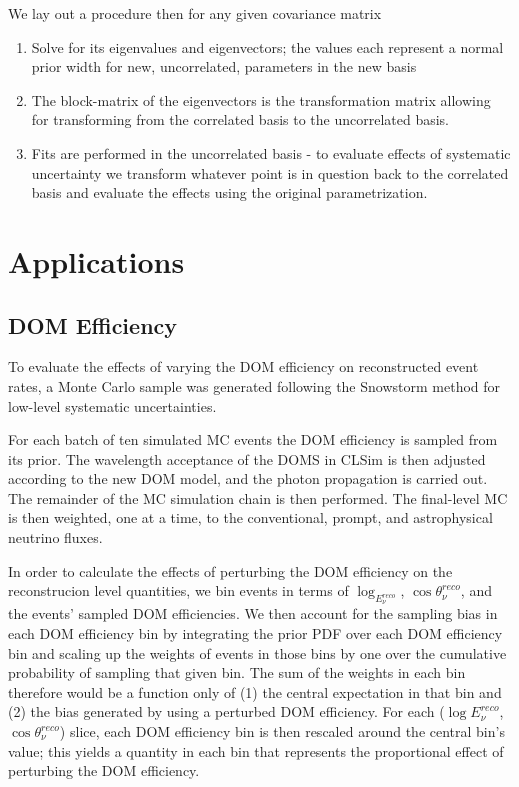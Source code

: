 \documentclass[main.tex]{subfiles}
\begin{document}
We lay out a procedure then for any given covariance matrix
\begin{enumerate}
    \item Solve for its eigenvalues and eigenvectors; the values each represent a normal prior width for new, uncorrelated, parameters in the new basis
    \item The block-matrix of the eigenvectors is the transformation matrix allowing for transforming from the correlated basis to the uncorrelated basis. 
    \item Fits are performed in the uncorrelated basis - to evaluate effects of systematic uncertainty we transform whatever point is in question back to the correlated basis and evaluate the effects using the original parametrization. 
\end{enumerate}

\section{Applications}
\subsection{DOM Efficiency}\label{subsect:domeff}

To evaluate the effects of varying the DOM efficiency on reconstructed event rates, a Monte Carlo sample was generated following the Snowstorm method for low-level systematic uncertainties.

For each batch of ten simulated MC events the DOM efficiency is sampled from its prior. 
The wavelength acceptance of the DOMS in CLSim is then adjusted according to the new DOM model, and the photon propagation is carried out. 
The remainder of the MC simulation chain is then performed.
The final-level MC is then weighted, one at a time, to the conventional, prompt, and astrophysical neutrino fluxes. 

In order to calculate the effects of perturbing the DOM efficiency on the reconstrucion level quantities, we bin events in terms of $\log_{E_{\nu}^{reco}}$, $\cos\theta_{\nu}^{reco}$, and the events' sampled DOM efficiencies. 
We then account for the sampling bias in each DOM efficiency bin by integrating the prior PDF over each DOM efficiency bin and scaling up the weights of events in those bins by one over the cumulative probability of sampling that given bin. 
The sum of the weights in each bin therefore would be a function only of (1) the central expectation in that bin and (2) the bias generated by using a perturbed DOM efficiency. 
For each ($\log E_{\nu}^{reco}$, $\cos\theta_{\nu}^{reco}$) slice, each DOM efficiency bin is then rescaled around the central bin's value; this yields a quantity in each bin that represents the proportional effect of perturbing the DOM efficiency. 
\end{document}
